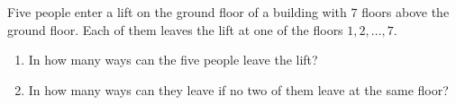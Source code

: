 Five people enter a lift on the ground floor of a building with $7$ floors above the ground floor. Each of them leaves the lift at one of the floors $1,2,\dots,7$.
\begin{enumerate}
\item[(I)] In how many ways can the five people leave the lift?
\item[(II)] In how many ways can they leave if no two of them leave at the same floor?
\end{enumerate}
